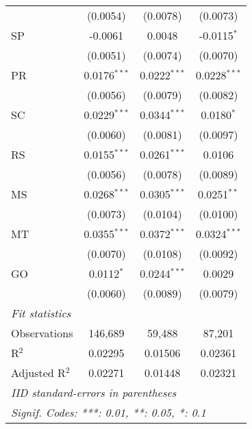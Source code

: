 \begin{tabular}{lccc}
                   & (0.0054)                & (0.0078)                & (0.0073)\\   
   SP              & -0.0061                 & 0.0048                  & -0.0115$^{*}$\\   
                   & (0.0051)                & (0.0074)                & (0.0070)\\   
   PR              & 0.0176$^{***}$          & 0.0222$^{***}$          & 0.0228$^{***}$\\   
                   & (0.0056)                & (0.0079)                & (0.0082)\\   
   SC              & 0.0229$^{***}$          & 0.0344$^{***}$          & 0.0180$^{*}$\\   
                   & (0.0060)                & (0.0081)                & (0.0097)\\   
   RS              & 0.0155$^{***}$          & 0.0261$^{***}$          & 0.0106\\   
                   & (0.0056)                & (0.0078)                & (0.0089)\\   
   MS              & 0.0268$^{***}$          & 0.0305$^{***}$          & 0.0251$^{**}$\\   
                   & (0.0073)                & (0.0104)                & (0.0100)\\   
   MT              & 0.0355$^{***}$          & 0.0372$^{***}$          & 0.0324$^{***}$\\   
                   & (0.0070)                & (0.0108)                & (0.0092)\\   
   GO              & 0.0112$^{*}$            & 0.0244$^{***}$          & 0.0029\\   
                   & (0.0060)                & (0.0089)                & (0.0079)\\   
   \midrule
   \emph{Fit statistics}\\
   Observations    & 146,689                 & 59,488                  & 87,201\\  
   R$^2$           & 0.02295                 & 0.01506                 & 0.02361\\  
   Adjusted R$^2$  & 0.02271                 & 0.01448                 & 0.02321\\  
   \midrule \midrule
   \multicolumn{4}{l}{\emph{IID standard-errors in parentheses}}\\
   \multicolumn{4}{l}{\emph{Signif. Codes: ***: 0.01, **: 0.05, *: 0.1}}\\
\end{tabular}
\par\endgroup



